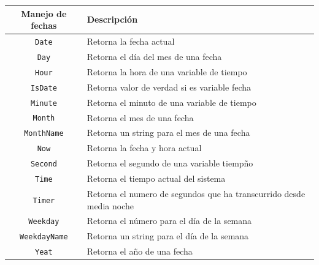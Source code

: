 \begin{table}[H]
    \centering
    \begin{tabular}{c|l}
       \rowcolor{micolor1} Manejo de fechas & Descripción \\ \hline
        \texttt{ Date } & Retorna la fecha actual\\
       \texttt{ Day } & Retorna el día del mes de una fecha \\
       \texttt{ Hour } & Retorna la hora de una variable de tiempo \\
       \texttt{ IsDate } & Retorna valor de verdad si es variable fecha \\
       \texttt{ Minute } & Retorna el minuto de una variable de tiempo \\
       \texttt{ Month } & Retorna el mes de una fecha\\
       \texttt{ MonthName } & Retorna un string para el mes de una fecha\\
       \texttt{ Now } & Retorna la fecha y hora actual \\
       \texttt{ Second } & Retorna el segundo de una variable tiempño \\
       \texttt{ Time } & Retorna el tiempo actual del sistema \\
       \texttt{ Timer } & Retorna el numero de segundos que ha transcurrido desde media noche \\
       \texttt{ Weekday } & Retorna el número para el día de la semana\\
       \texttt{ WeekdayName } & Retorna un string para el día de la semana\\
       \texttt{ Yeat } & Retorna el año de una fecha\\
    \end{tabular}
\end{table}

